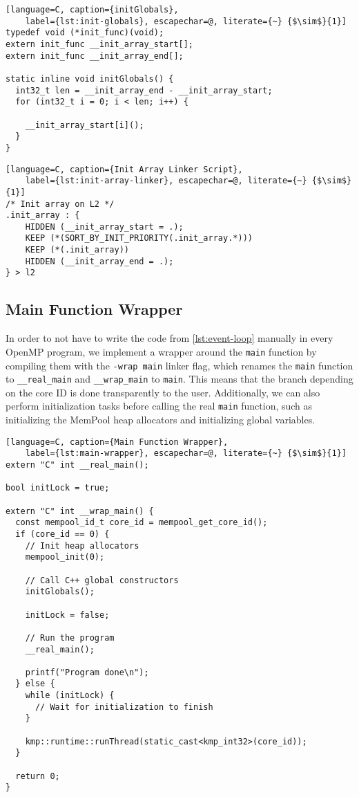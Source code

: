 \begin{lstlisting}[language=C, caption={initGlobals},
	label={lst:init-globals}, escapechar=@, literate={~} {$\sim$}{1}]
typedef void (*init_func)(void);
extern init_func __init_array_start[];
extern init_func __init_array_end[];

static inline void initGlobals() {
  int32_t len = __init_array_end - __init_array_start;
  for (int32_t i = 0; i < len; i++) {

    __init_array_start[i]();
  }
}
\end{lstlisting}

\begin{lstlisting}[language=C, caption={Init Array Linker Script},
	label={lst:init-array-linker}, escapechar=@, literate={~} {$\sim$}{1}]
/* Init array on L2 */
.init_array : {
    HIDDEN (__init_array_start = .);
    KEEP (*(SORT_BY_INIT_PRIORITY(.init_array.*)))
    KEEP (*(.init_array))
    HIDDEN (__init_array_end = .);
} > l2
\end{lstlisting}

\subsection{Main Function Wrapper}

In order to not have to write the code from \cref{lst:event-loop} manually in every OpenMP program,
we implement a wrapper around the \texttt{main} function by compiling them with the \texttt{-wrap
	main} linker flag, which renames the \texttt{main} function to \texttt{\_\_real\_main} and
\texttt{\_\_wrap\_main} to \texttt{main}. This means that the branch depending on the core ID is
done transparently to the user. Additionally, we can also perform initialization tasks before
calling the real \texttt{main} function, such as initializing the MemPool heap allocators and
initializing global variables.

\begin{lstlisting}[language=C, caption={Main Function Wrapper},
	label={lst:main-wrapper}, escapechar=@, literate={~} {$\sim$}{1}]
extern "C" int __real_main();

bool initLock = true;

extern "C" int __wrap_main() {
  const mempool_id_t core_id = mempool_get_core_id();
  if (core_id == 0) {
    // Init heap allocators
    mempool_init(0);

    // Call C++ global constructors
    initGlobals();

    initLock = false;

    // Run the program
    __real_main();

    printf("Program done\n");
  } else {
    while (initLock) {
      // Wait for initialization to finish
    }

    kmp::runtime::runThread(static_cast<kmp_int32>(core_id));
  }

  return 0;
}
\end{lstlisting}
